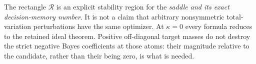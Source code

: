The rectangle $\mathcal R$ is an explicit stability region for the
\emph{saddle and its exact decision-memory number}. It is not a claim
that arbitrary nonsymmetric total-variation perturbations have the same
optimizer. At $\kappa=0$ every formula reduces to the retained ideal
theorem. Positive off-diagonal target masses do not destroy the strict
negative Bayes coefficients at those atoms: their magnitude relative
to the candidate, rather than their being zero, is what is needed.
